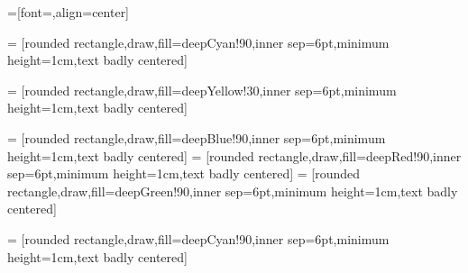 \usetikzlibrary{backgrounds}



=[font=\sffamily,align=center]

\newcommand{\fillOpacity}{90}
\newcommand{\fillOpacityTwo}{30}
\newcommand{\fillOpacityThree}{10}

\newcommand{\compShape}{rectangle}
\newcommand{\groupShape}{chamfered rectangle}
\newcommand{\funcShape}{chamfered rectangle}
\newcommand{\procShape}{rounded rectangle}

\newcommand{\explicitColor}{deepGreen}
\newcommand{\customColor}{deepYellow}
\newcommand{\implicitColor}{deepCyan}
\newcommand{\optimizationColor}{deepCyan}
\newcommand{\fluidColor}{deepBlue}
\newcommand{\solidColor}{deepRed}
\newcommand{\propulsionColor}{deepYellow}
\newcommand{\FuncFluidColor}{deepBlue}
\newcommand{\FuncSolidColor}{deepRed}

 = [\procShape,draw,fill=\optimizationColor!\fillOpacity,inner sep=6pt,minimum height=1cm,text badly centered]

 = [\procShape,draw,fill=deepYellow!\fillOpacityTwo,inner sep=6pt,minimum height=1cm,text badly centered]

 = [\procShape,draw,fill=deepBlue!\fillOpacity,inner sep=6pt,minimum height=1cm,text badly centered]
 = [\procShape,draw,fill=deepRed!\fillOpacity,inner sep=6pt,minimum height=1cm,text badly centered]
 = [\procShape,draw,fill=deepGreen!\fillOpacity,inner sep=6pt,minimum height=1cm,text badly centered]

 = [\procShape,draw,fill=\optimizationColor!\fillOpacity,inner sep=6pt,minimum height=1cm,text badly centered]

